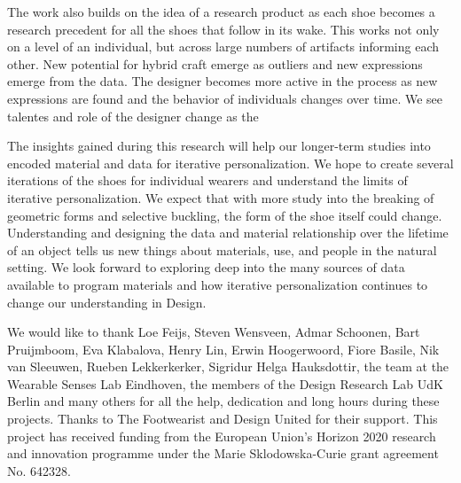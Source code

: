 The work also builds on the idea of a research product as each shoe becomes a research precedent for all the shoes that follow in its wake. This works not only on a level of an individual, but across large numbers of artifacts informing each other. New potential for hybrid craft emerge as outliers and new expressions emerge from the data. The designer becomes more active in the process as new expressions are found and the behavior of individuals changes over time. We see talentes and  role of the designer change as the 



The insights gained during this research will help our longer-term studies into encoded material and data for iterative personalization. We hope to create several iterations of the shoes for individual wearers and understand the limits of iterative personalization. We expect that with more study into the breaking of geometric forms and selective buckling, the form of the shoe itself could change. Understanding and designing the data and material relationship over the lifetime of an object tells us new things about materials, use, and people in the natural setting. We look forward to exploring deep into the many sources of data available to program materials and how iterative personalization continues to change our understanding in Design. 


\begin{acks}
We would like to thank Loe Feijs, Steven Wensveen, Admar Schoonen, Bart Pruijmboom, Eva Klabalova, Henry Lin, Erwin Hoogerwoord, Fiore Basile, Nik van Sleeuwen, Rueben Lekkerkerker, Sigridur Helga Hauksdottir, the team at the Wearable Senses Lab Eindhoven, the members of the Design Research Lab UdK Berlin and many others for all the help, dedication and long hours during these projects. Thanks to The Footwearist and Design United for their support. This project has received funding from the European Union's Horizon 2020 research and innovation programme under the Marie Sklodowska-Curie grant agreement No. 642328.
\end{acks}
